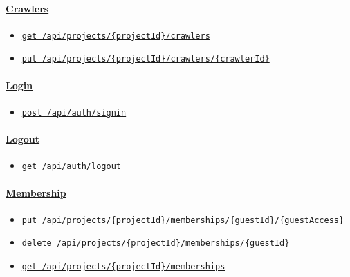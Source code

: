 {
\setcounter{secnumdepth}{3}

\hypertarget{crawlers}{%
\paragraph{\texorpdfstring{\protect\hyperlink{Crawlers}{Crawlers}}{Crawlers}}\label{crawlers}}

\begin{itemize}
\tightlist
\item
  \protect\hyperlink{listSpiders}{\texttt{get\ /api/projects/\{projectId\}/crawlers}}
\item
  \protect\hyperlink{updateSpider}{\texttt{put\ /api/projects/\{projectId\}/crawlers/\{crawlerId\}}}
\end{itemize}

\hypertarget{login}{%
\paragraph{\texorpdfstring{\protect\hyperlink{Login}{Login}}{Login}}\label{login}}

\begin{itemize}
\tightlist
\item
  \protect\hyperlink{signIn}{\texttt{post\ /api/auth/signin}}
\end{itemize}

\hypertarget{logout}{%
\paragraph{\texorpdfstring{\protect\hyperlink{Logout}{Logout}}{Logout}}\label{logout}}

\begin{itemize}
\tightlist
\item
  \protect\hyperlink{logout}{\texttt{get\ /api/auth/logout}}
\end{itemize}

\hypertarget{membership}{%
\paragraph{\texorpdfstring{\protect\hyperlink{Membership}{Membership}}{Membership}}\label{membership}}

\begin{itemize}
\tightlist
\item
  \protect\hyperlink{addParticipants}{\texttt{put\ /api/projects/\{projectId\}/memberships/\{guestId\}/\{guestAccess\}}}
\item
  \protect\hyperlink{deleteParticipant}{\texttt{delete\ /api/projects/\{projectId\}/memberships/\{guestId\}}}
\item
  \protect\hyperlink{getParticipants}{\texttt{get\ /api/projects/\{projectId\}/memberships}}
\end{itemize}

}
